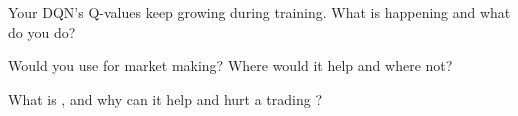 \begin{interviewq}\label{iq:ml:reinforcement-learning-for-execution-and-market-making:4}
Your DQN's Q-values keep growing during training. What is happening and what do you do?
\end{interviewq}

\begin{interviewq}\label{iq:ml:reinforcement-learning-for-execution-and-market-making:5}
Would you use  for market making? Where would it help and where not?
\end{interviewq}

\begin{interviewq}\label{iq:ml:reinforcement-learning-for-execution-and-market-making:6}
What is , and why can it help and hurt a trading ?
\end{interviewq}
